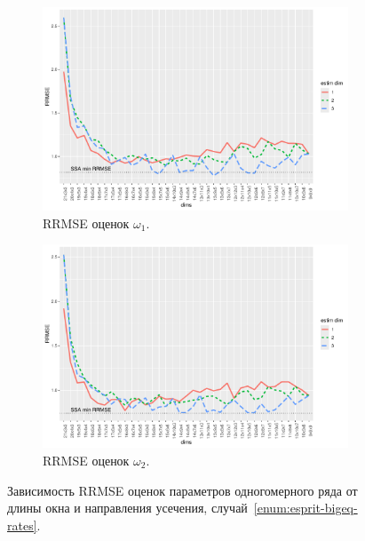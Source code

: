 \documentclass[specialist,
  substylefile=spbu_report.rtx,
subf,href,colorlinks=true, 12pt]{disser}
\theoremstyle{plain}
\theoremstyle{definition}
\theoremstyle{remark}
\begin{document}
\begin{figure}[!ht]
\begin{subfigure}{0.49\linewidth}
    \includegraphics[width=\linewidth, height=0.167\textheight]{freq1_dims_large_eq_rates.pdf}
    \caption{RRMSE оценок $\omega_1$.}
    \label{fig:freq1_dims_large_eq_rates}
  \end{subfigure}
  \begin{subfigure}{0.49\linewidth}
    \includegraphics[width=\linewidth, height=0.167\textheight]{freq2_dims_large_eq_rates.pdf}
    \caption{RRMSE оценок $\omega_2$.}
    \label{fig:freq2_dims_large_eq_rates}
  \end{subfigure}
  \caption{Зависимость RRMSE оценок параметров одногомерного ряда
    от длины окна и направления усечения,
  случай~\ref{enum:esprit-bigeq-rates}.}
  \label{fig:dims_large_eq_rates}
\end{figure}
\end{document}
